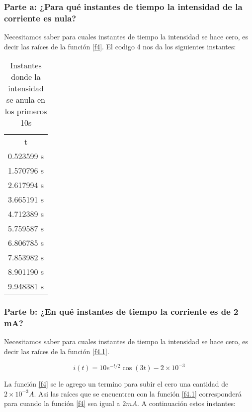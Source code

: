 \documentclass[12pt]{article}
\begin{document}
\subsubsection{Parte a: ¿Para qué instantes de tiempo la intensidad de la corriente es nula?}
Necesitamos saber para cuales instantes de tiempo la intensidad se hace cero, es decir las raíces de la función \ref{f4}. El codigo 4 nos da los siguientes instantes:


\begin{table}[h]
    \centering
    \begin{tabular}{c}
        t\\
        0.523599 s\\
        1.570796 s\\
        2.617994 s \\
        3.665191 s\\
        4.712389 s\\
        5.759587 s\\
        6.806785 s\\
        7.853982 s\\
        8.901190 s\\
        9.948381 s\\
    \end{tabular}
    \caption{Instantes donde la intensidad se anula en los primeros 10s}
    \label{tab:my_label}
\end{table}

\subsubsection{Parte b: ¿En qué instantes de tiempo la corriente es de 2 mA?}
Necesitamos saber para cuales instantes de tiempo la intensidad se hace cero, es decir las raíces de la función \ref{f4.1}.

\begin{equation}
\label{f4.1}
    i(t) = 10e^{-t/2}\cos(3t) - 2\times 10^{-3}
\end{equation}

La función \ref{f4} se le agrego un termino para subir el cero una cantidad de $2\times 10^{-3} A$. Asi las raíces que se encuentren con la función \ref{f4.1} corresponderá para cuando la función  \ref{f4} sea igual a $2mA$. A continuación estos instantes:
\end{document}
